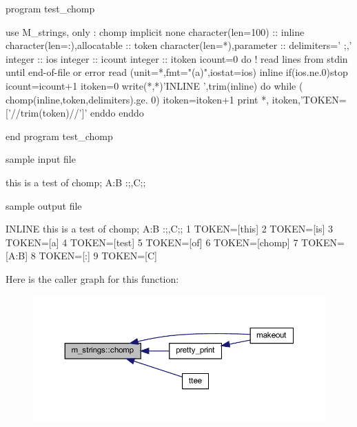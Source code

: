 \begin{DoxyVerb}program test_chomp

   use M_strings, only : chomp
   implicit none
   character(len=100)            :: inline
   character(len=:),allocatable  :: token
   character(len=*),parameter    :: delimiters=' ;,'
   integer                       :: ios
   integer                       :: icount
   integer                       :: itoken
      icount=0
      do        ! read lines from stdin until end-of-file or error
         read (unit=*,fmt="(a)",iostat=ios) inline
         if(ios.ne.0)stop
         icount=icount+1
         itoken=0
         write(*,*)'INLINE ',trim(inline)
         do while ( chomp(inline,token,delimiters).ge. 0)
            itoken=itoken+1
            print *, itoken,'TOKEN=['//trim(token)//']'
         enddo
      enddo

end program test_chomp

sample input file

 this is a test of chomp; A:B :;,C;;

sample output file

 INLINE     this is a test of chomp; A:B :;,C;;
           1 TOKEN=[this]
           2 TOKEN=[is]
           3 TOKEN=[a]
           4 TOKEN=[test]
           5 TOKEN=[of]
           6 TOKEN=[chomp]
           7 TOKEN=[A:B]
           8 TOKEN=[:]
           9 TOKEN=[C] \end{DoxyVerb}
 Here is the caller graph for this function\+:
\nopagebreak
\begin{figure}[H]
\begin{center}
\leavevmode
\includegraphics[width=350pt]{namespacem__strings_aa3fc15a665eeff512b7f5269029f558d_icgraph}
\end{center}
\end{figure}
\mbox{\label{namespacem__strings_a3a022b64dc902dc6043e3f265ee78e38}} 
